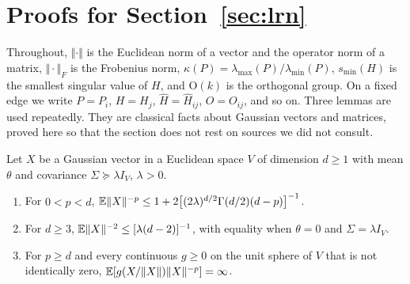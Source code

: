 \section{Proofs for \texorpdfstring{Section~\ref{sec:lrn}}{learned interfaces}}\label{app:lrn}

Throughout, $\Vert\cdot\Vert$ is the Euclidean norm of a vector and the operator norm of a matrix, $\Vert\cdot\Vert_F$ is the Frobenius norm, $\kappa(P)=\lambda_{\max}(P)/\lambda_{\min}(P)$, $s_{\min}(H)$ is the smallest singular value of $H$, and $\mathrm O(k)$ is the orthogonal group. On a fixed edge we write $P=P_i$, $H=H_j$, $\hat H=\hat H_{ij}$, $O=O_{ij}$, and so on. Three lemmas are used repeatedly. They are classical facts about Gaussian vectors and matrices, proved here so that the section does not rest on sources we did not consult.

\begin{lemma}\label{lem:lrn-inverse-norm}
Let $X$ be a Gaussian vector in a Euclidean space $V$ of dimension $d\ge1$ with mean $\theta$ and covariance $\Sigma\succeq\lambda I_V$, $\lambda>0$.
\begin{enumerate}
\item[(a)] For $0<p<d$, $\mathbb{E}\Vert X\Vert^{-p}\le1+2\bigl[(2\lambda)^{d/2}\Gamma(d/2)(d-p)\bigr]^{-1}$.
\item[(b)] For $d\ge3$, $\mathbb{E}\Vert X\Vert^{-2}\le[\lambda(d-2)]^{-1}$, with equality when $\theta=0$ and $\Sigma=\lambda I_V$.
\item[(c)] For $p\ge d$ and every continuous $g\ge0$ on the unit sphere of $V$ that is not identically zero, $\mathbb{E}[g(X/\Vert X\Vert)\Vert X\Vert^{-p}]=\infty$.
\end{enumerate}
\end{lemma}

